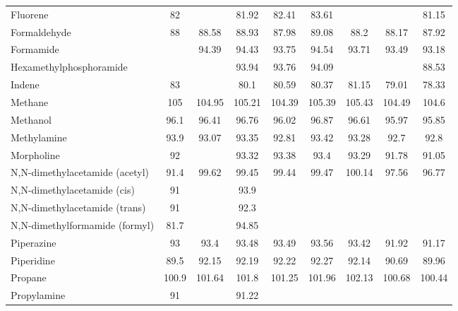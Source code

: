 \begin{center}
\begin{longtable}{l | c c c c c c c c}
 Fluorene                       &    82 &        &     81.92 &  82.41 &   83.61 &          &        &   81.15 \\
 Formaldehyde                   &    88 &  88.58 &     88.93 &  87.98 &   89.08 &     88.2 &  88.17 &   87.92 \\
 Formamide                      &       &  94.39 &     94.43 &  93.75 &   94.54 &    93.71 &  93.49 &   93.18 \\
 Hexamethylphosphoramide        &       &        &     93.94 &  93.76 &   94.09 &          &        &   88.53 \\
 Indene                         &    83 &        &      80.1 &  80.59 &   80.37 &    81.15 &  79.01 &   78.33 \\
 Methane                        &   105 & 104.95 &    105.21 & 104.39 &  105.39 &   105.43 & 104.49 &   104.6 \\
 Methanol                       &  96.1 &  96.41 &     96.76 &  96.02 &   96.87 &    96.61 &  95.97 &   95.85 \\
 Methylamine                    &  93.9 &  93.07 &     93.35 &  92.81 &   93.42 &    93.28 &   92.7 &    92.8 \\
 Morpholine                     &    92 &        &     93.32 &  93.38 &    93.4 &    93.29 &  91.78 &   91.05 \\
 N,N-dimethylacetamide (acetyl) &  91.4 &  99.62 &     99.45 &  99.44 &   99.47 &   100.14 &  97.56 &   96.77 \\
 N,N-dimethylacetamide (cis)    &    91 &        &      93.9 &        &         &          &        &         \\
 N,N-dimethylacetamide (trans)  &    91 &        &      92.3 &        &         &          &        &         \\
 N,N-dimethylformamide (formyl) &  81.7 &        &     94.85 &        &         &          &        &         \\
 Piperazine                     &    93 &   93.4 &     93.48 &  93.49 &   93.56 &    93.42 &  91.92 &   91.17 \\
 Piperidine                     &  89.5 &  92.15 &     92.19 &  92.22 &   92.27 &    92.14 &  90.69 &   89.96 \\
 Propane                        & 100.9 & 101.64 &     101.8 & 101.25 &  101.96 &   102.13 & 100.68 &  100.44 \\
 Propylamine                    &    91 &        &     91.22 &        &         &          &        &         \\

\end{longtable}
\end{center}
